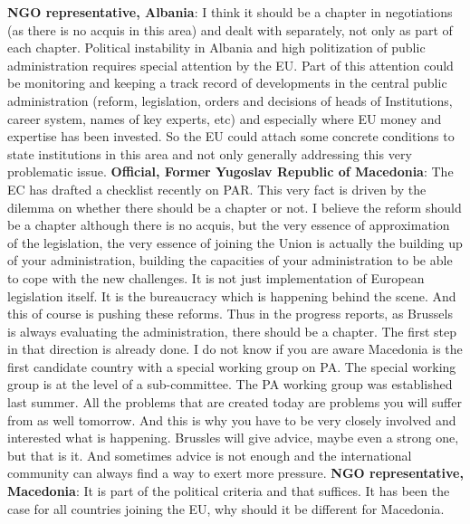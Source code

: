 \textbf{NGO representative, Albania}: I think it should be a chapter in negotiations (as there is no acquis in this area) and dealt with separately, not only as part of each chapter. Political instability in Albania and high politization of public administration requires special attention by the EU. Part of this attention could be monitoring and keeping a track record of developments in the central public administration (reform, legislation, orders and decisions of heads of Institutions, career system, names of key experts, etc) and especially where EU money and expertise has been invested. So the EU could attach some concrete conditions to state institutions in this area and not only generally addressing this very problematic issue. 
\textbf{Official, Former Yugoslav Republic of Macedonia}: The EC has drafted a checklist recently on PAR. This very fact is driven by the dilemma on whether there should be a chapter or not. I believe the reform should be a chapter although there is no acquis, but the very essence of approximation of the legislation, the very essence of joining the Union is actually the building up of your administration, building the capacities of your administration to be able to cope with the new challenges. It is not just implementation of European legislation itself. It is the bureaucracy which is happening behind the scene. And this of course is pushing these reforms. Thus in the progress reports, as Brussels is always evaluating the administration, there should be a chapter. The first step in that direction is already done. I do not know if you are aware Macedonia is the first candidate country with a special working group on PA. The special working group is at the level of a sub-committee. The PA working group was established last summer. All the problems that are created today are problems you will suffer from as well tomorrow. And this is why you have to be very closely involved and interested what is happening. Brussles will give advice, maybe even a strong one, but that is it. And sometimes advice is not enough and the international community can always find a way to exert more pressure.
\textbf{NGO representative, Macedonia}: It is part of the political criteria and that suffices. It has been the case for all countries joining the EU, why should it be different for Macedonia.
